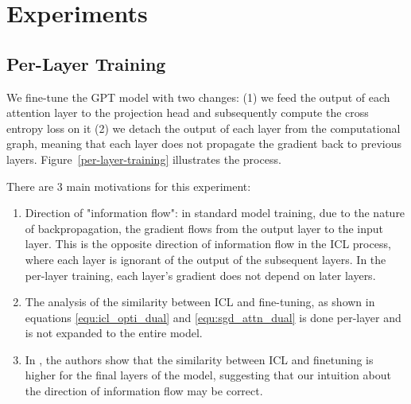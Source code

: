 \documentclass[11pt]{article}
\begin{document}
\section{Experiments}
\subsection{Per-Layer Training}
We fine-tune the GPT model with two changes: (1) we feed the output of each attention layer to the projection head and subsequently compute the cross entropy loss on it
(2) we detach the output of each layer from the computational graph, meaning that each layer does not propagate the gradient back to previous layers. Figure~\ref{per-layer-training} illustrates the process.

There are 3 main motivations for this experiment:
\begin{enumerate}
	\item Direction of "information flow": in standard model training, due to the nature of backpropagation, the gradient flows from the output layer to the input layer.
	      This is the opposite direction of information flow in the ICL process, where each layer is ignorant of the output of the subsequent layers.
	      In the per-layer training, each layer's gradient does not depend on later layers.
	\item The analysis of the similarity between ICL and fine-tuning, as shown in equations \ref{equ:icl_opti_dual} and \ref{equ:sgd_attn_dual} is done per-layer and is not expanded to the entire model.
	\item In \cite{dai2023gpt}, the authors show that the similarity between ICL and finetuning is higher for the final layers of the model, suggesting that our intuition about the direction of information flow may be correct.
\end{enumerate}
\end{document}
